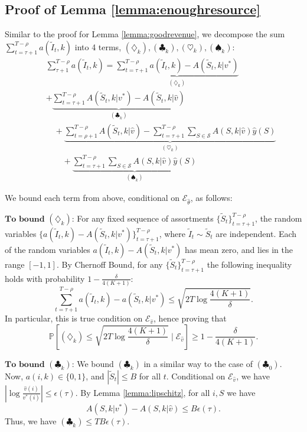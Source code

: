 \documentclass{article}
\theoremstyle{definition}
\newcommand{\PPP}{\mathbb{P}}
\newcommand{\SSS}{\mathcal{S}}
\begin{document}
\subsection{Proof of Lemma \ref{lemma:enoughresource}}\label{app:pflemmaenoughresource}
Similar to the proof for Lemma \ref{lemma:goodrevenue}, we decompose the sum $\sum^{T - \rho}_{t = \tau + 1} a(\tilde{I}_t, k)$ into 4 terms, $(\diamondsuit_k), (\clubsuit_k), (\heartsuit_k), (\spadesuit_k)$:
\begin{align}
& \sum^{T-\rho}_{\tau+1}a(\tilde{I}_t, k) = \underbrace{\sum^{T-\rho}_{t=\tau+1}a(\tilde{I}_t, k) - A(\tilde{S}_t, k| v^*)}_{(\diamondsuit_k)} \nonumber\\
\quad & +\underbrace{\sum^{T-\rho}_{t = \tau+1} A(\tilde{S}_t, k | v^*) - A(\tilde{S}_t, k | \hat{v})}_{(\clubsuit_k)} \nonumber\\
\quad & \quad + \underbrace{\sum^{T-\rho}_{t = \rho+1} A(\tilde{S}_t,k | \hat{v}) - \sum^{T-\rho}_{t = \tau +1}\sum_{S\in\SSS}A(S, k | \hat{v})\hat{y}(S)}_{(\heartsuit_k)} \nonumber\\
\quad & \qquad + \underbrace{\sum^{T-\rho}_{t = \tau +1}\sum_{S\in\SSS}A(S, k | \hat{v})\hat{y}(S)}_{(\spadesuit_k)} \nonumber 
\end{align}

We bound each term from above, conditional on $\mathcal{E}_{\hat{\theta}}$, as follows:

$\textbf{To bound $(\diamondsuit_k)$:}$ For any fixed sequence of assortments $\{\tilde{S}_t\}^{T-\rho}_{t = \tau + 1}$, the random variables $\{a(\tilde{I}_t, k) - A(\tilde{S}_t, k | v^*)\}^{T-\rho}_{t = \tau + 1}$, where $\tilde{I}_t\sim \tilde{S}_t$ are independent. Each of the random variables $a(\tilde{I}_t, k) - A(\tilde{S}_t, k | v^*)$ has mean zero, and lies in the range $[-1, 1]$. By Chernoff Bound, for any $\{\tilde{S}_t\}^{T-\rho}_{t = \tau + 1}$ the following inequality holds with probability $1 - \frac{\delta}{4(K+1)}$: 
$$\sum^{T-\rho}_{t=\tau+1}a(\tilde{I}_t, k) - a(\tilde{S}_t, k|v^*) \leq \sqrt{2T\log{\frac{4(K+1)}{\delta}}}. $$
In particular, this is true condition on $\mathcal{E}_{\hat{v}}$, hence proving that $$\PPP\left[(\diamondsuit_k)\leq \sqrt{2T\log{\frac{4(K+1)}{\delta}}}\mid \mathcal{E}_{\hat{v}}\right] \geq 1 - \frac{\delta}{4(K+1)} .$$

$\textbf{To bound $(\clubsuit_k)$:}$ We bound $(\clubsuit_k)$ in a similar way to the case of $(\clubsuit_0)$. Now, $a(i, k)\in \{0,1\}$, and $|\tilde{S}_t|\leq B$ for all $t$. Conditional on $\mathcal{E}_{\hat{v}}$, we have $\left|\log\frac{\hat{v}(i)}{v^*(i)}\right|\leq \epsilon(\tau)$. By Lemma \ref{lemma:lipschitz}, for all $i, S$ we have 
$$A( S, k | v^*) - A(S, k | \hat{v})\leq B\epsilon(\tau).$$
Thus, we have $(\clubsuit_k)\leq TB\epsilon(\tau).$
 
\end{document}
